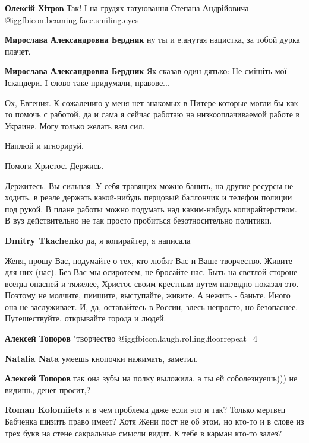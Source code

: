 \begin{itemize}
\begin{itemize}
\textbf{Олексій Хітров} Так! І на грудях татуювання Степана Андрійовича  @igg{fbicon.beaming.face.smiling.eyes} 

\textbf{Мирослава Александровна Бердник} ну ты и е.анутая нацистка, за тобой дурка плачет.

\textbf{Мирослава Александровна Бердник} Як сказав один дятько: Не смішіть мої Іскандери. І слово таке придумали, правове...
\end{itemize} %


Ох, Евгения. К сожалению у меня нет знакомых в Питере которые могли бы как то
помочь с работой, да и сама я сейчас работаю на низкооплачиваемой работе в
Украине. Могу только желать вам сил.


Наплюй и игнорируй.

Помоги Христос. Держись.


Держитесь. Вы сильная. У себя травящих можно банить, на другие ресурсы не
ходить, в реале держать какой-нибудь перцовый баллончик и телефон полиции под
рукой. В плане работы можно подумать над каким-нибудь копирайтерством. В вуз
действительно не так просто пробиться безотносительно политики.

\textbf{Dmitry Tkachenko} да, я копирайтер, я написала


Женя, прошу Вас, подумайте о тех, кто любят Вас и Ваше творчество. Живите для
них (нас). Без Вас мы осиротеем, не бросайте нас. Быть на светлой стороне
всегда опасней и тяжелее, Христос своим крестным путем наглядно показал это.
Поэтому не молчите, пиишите, выступайте, живите. А нежить - баньте. Иного она
не заслуживает. И, да, оставайтесь в России, злесь непросто, но безопаснее.
Путешествуйте, открывайте города и людей.

\begin{itemize} %
\textbf{Алексей Топоров} "творчество @igg{fbicon.laugh.rolling.floor}{repeat=4} 

\textbf{Natalia Nata} умеешь кнопочки нажимать, заметил.

\textbf{Алексей Топоров} так она зубы на полку выложила, а ты ей соболезнуешь))) не видишь, денег просит,?

\textbf{Roman Kolomiiets} и в чем проблема даже если это и так? Только мертвец Бабченка шизить право имеет? Хотя Жени пост не об этом, но кто-то и в слове из трех букв на стене сакральные смысли видит. К тебе в карман кто-то залез?


\end{itemize}
\end{itemize}
